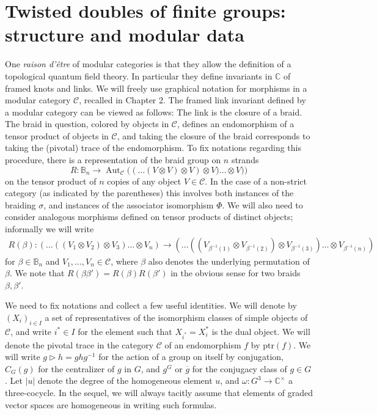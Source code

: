 \documentclass[a4paper, 10pt]{book}
\theoremstyle{definition}
\numberwithin{equation}{chapter}
\newcommand\ol[1]{\overline{#1}}
\newcommand\ptr{\text{ptr}}
\newcommand\hit{\triangleright}
\newcommand\inv{^{-1}}
\newcommand\ot{\otimes}
\newcommand\CC{\mathbb C}
\newcommand\CCu{\CC^\times}
\newcommand\C{\mathcal C}
\begin{document}
\section{Twisted doubles of finite groups: structure and modular data}
One \emph{raison d'être} of modular categories is that they allow the definition of a topological quantum field theory. In particular they define invariants in $\CC$ of framed knots and links. We will freely use graphical notation for morphisms in a modular category $\C$, recalled in Chapter 2. The framed link invariant defined by a modular category can be viewed as follows: The link is the closure of a braid. The braid in question, colored by objects in $\C$,  defines an endomorphism of a tensor product of o{}bjects in $\C$, and taking the closure of the braid corresponds to taking the (pivotal) trace of the endomorphism. To fix notations regarding this procedure, there is a representation of the braid group on $n$ strands
$$R\colon\mathbb B_n\to\operatorname{Aut}_{\C}\bigl( (\dots(V\ot V)\ot V)\ot V)\dots \ot V)\bigr)$$
on the tensor product of $n$ copies of any object $V\in\C$. In the case of a non-strict category (as indicated by the parentheses) this involves both instances of the braiding $\sigma$, and instances of the associator isomorphism $\Phi$. We will also need to consider analogous morphisms defined on tensor products of distinct objects; informally we will write
\begin{multline*}
  R(\beta)\colon (\dots((V_1\ot V_2)\ot V_3)\dots\ot V_n)\rightarrow (\dots((V_{\beta\inv(1)}\ot V_{\beta\inv(2)})\ot V_{\beta\inv(3)})\dots\ot V_{\beta\inv(n)}) 
\end{multline*}
for $\beta\in\mathbb B_n$ and $V_1,\dots,V_n\in\C$, where $\beta$ also denotes the underlying permutation of $\beta$. We note that  $R(\beta\beta')=R(\beta)R(\beta')$ in the obvious sense for two braids $\beta,\beta'$.

 We need to fix notations and collect a few useful identities. We will denote by $(X_i)_{i\in I}$ a set of representatives of the isomorphism classes of simple objects of $\C$, and write $i^*\in I$ for the element such that $X_{i^*}=X_i^*$ is the dual object. We will denote the pivotal trace in the category $\C$ of an endomorphism $f$ by $\ptr(f)$. We will write $g\hit h=ghg\inv$ for the action of a group on itself by conjugation, $C_G(g)$ for the centralizer of $g$ in $G$, and $g^G$ or $\ol g$ for the conjugacy class of $g\in G$. 
Let $|u|$ denote the degree of the homogeneous element $u$, and $\omega\colon G^3\rightarrow\CCu$ a three-cocycle. In the sequel, we will always tacitly assume that elements of graded vector spaces are homogeneous in writing such formulas.
\end{document}
